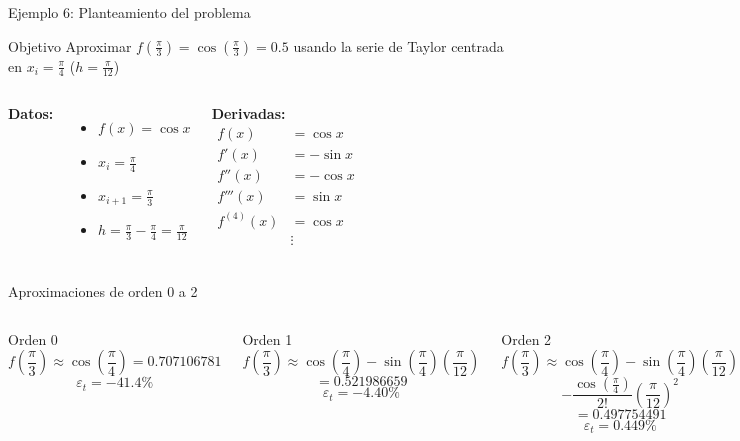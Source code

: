 \documentclass[main.tex]{subfiles}
\begin{document}
\begin{frame}{Ejemplo 6: Planteamiento del problema}
\begin{block}{Objetivo}
Aproximar $f\left(\frac{\pi}{3}\right) = \cos\left(\frac{\pi}{3}\right) = 0.5$ usando la serie de Taylor centrada en $x_i = \frac{\pi}{4}$ ($h = \frac{\pi}{12}$)
\end{block}

\begin{columns}[T]
\textbf{Datos:}
\begin{itemize}
\item $f(x) = \cos x$
\item $x_i = \frac{\pi}{4}$
\item $x_{i+1} = \frac{\pi}{3}$
\item $h = \frac{\pi}{3} - \frac{\pi}{4} = \frac{\pi}{12}$
\end{itemize}

\textbf{Derivadas:}
\begin{align*}
f(x) &= \cos x \\
f'(x) &= -\sin x \\
f''(x) &= -\cos x \\
f'''(x) &= \sin x \\
f^{(4)}(x) &= \cos x \\
&\vdots
\end{align*}
\end{columns}
\end{frame}

\begin{frame}{Aproximaciones de orden 0 a 2}
\begin{columns}[T]
\begin{block}{Orden 0}
\[ f\left(\frac{\pi}{3}\right) \approx \cos\left(\frac{\pi}{4}\right) = 0.707106781 \]
\[ \varepsilon_t = -41.4\% \]
\end{block}

\begin{block}{Orden 1}
\[ f\left(\frac{\pi}{3}\right) \approx \cos\left(\frac{\pi}{4}\right) - \sin\left(\frac{\pi}{4}\right)\left(\frac{\pi}{12}\right) \]
\[ = 0.521986659 \]
\[ \varepsilon_t = -4.40\% \]
\end{block}

\begin{block}{Orden 2}
\[ f\left(\frac{\pi}{3}\right) \approx \cos\left(\frac{\pi}{4}\right) - \sin\left(\frac{\pi}{4}\right)\left(\frac{\pi}{12}\right) \]
\[ - \frac{\cos\left(\frac{\pi}{4}\right)}{2!}\left(\frac{\pi}{12}\right)^2 \]
\[ = 0.497754491 \]
\[ \varepsilon_t = 0.449\% \]
\end{block}
\end{columns}
\end{frame}
\end{document}
